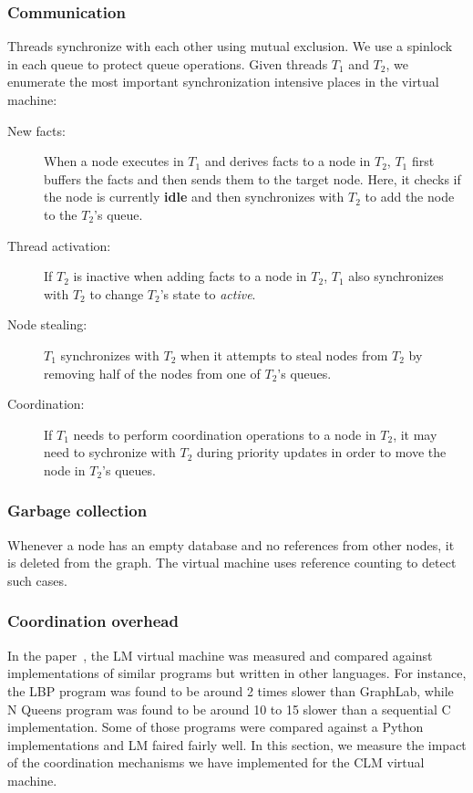 \subsubsection{Communication}

Threads synchronize with each other using mutual exclusion. We use a spinlock in
each queue to protect queue operations.
Given threads $T_1$ and $T_2$, we enumerate the most important
synchronization intensive places in the virtual machine:

\begin{description}
   \item[New facts:] When a node executes in $T_1$ and derives facts
   to a node in $T_2$, $T_1$ first buffers the facts 
   and then sends them to the target node. Here, it checks if the
   node is currently \textbf{idle} and then synchronizes with $T_2$ to add the
   node to the $T_2$'s queue.
   \item[Thread activation:] If $T_2$ is inactive when adding facts to a node in
   $T_2$, $T_1$ also synchronizes with $T_2$ to change $T_2$'s state to \emph{active}.
   \item[Node stealing:] $T_1$ synchronizes with $T_2$ when it attempts to steal
   nodes from $T_2$ by removing half of the nodes from one of $T_2$'s queues.
   \item[Coordination:] If $T_1$ needs to perform coordination operations
   to a node in $T_2$, it may need to sychronize with $T_2$ during priority
   updates in order to move the node in $T_2$'s queues.
\end{description}

\subsubsection{Garbage collection}

Whenever a node has an empty database and no references from other nodes, it is
deleted from the graph. The virtual machine uses reference counting to detect
such cases.

\subsubsection{Coordination overhead}

In the paper~\cite{cruz-ppdp14}, the LM virtual machine was measured and
compared against implementations of similar programs but written in other
languages. For instance, the LBP program was found to be around 2 times slower
than GraphLab, while N Queens program was found to be around 10 to 15 slower
than a sequential C implementation. Some of those programs were compared against
a Python implementations and LM faired fairly well. In this section, we measure
the impact of the coordination mechanisms we have implemented for the CLM
virtual machine.

